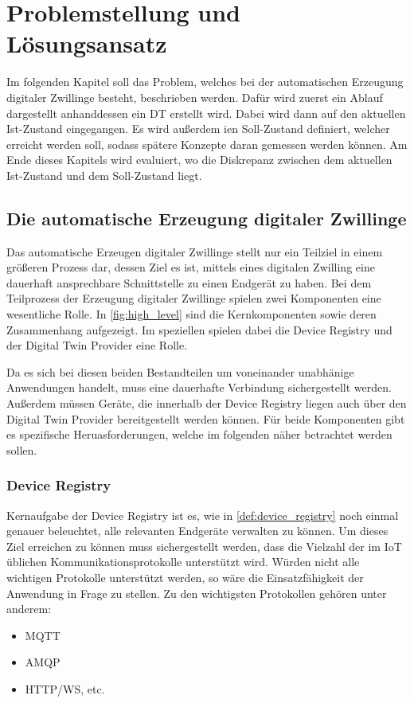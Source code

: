 \chapter{Problemstellung und Lösungsansatz}

Im folgenden Kapitel soll das Problem, welches bei der automatischen Erzeugung digitaler Zwillinge besteht, beschrieben werden. Dafür wird zuerst ein Ablauf dargestellt anhanddessen ein \ac{DT} erstellt wird. Dabei wird dann auf den aktuellen Ist-Zustand eingegangen. Es wird außerdem ien Soll-Zustand definiert, welcher erreicht werden soll, sodass spätere Konzepte daran gemessen werden können. Am Ende dieses Kapitels wird evaluiert, wo die Diskrepanz zwischen dem aktuellen Ist-Zustand und dem Soll-Zustand liegt.

\section{Die automatische Erzeugung digitaler Zwillinge}

Das automatische Erzeugen digitaler Zwillinge stellt nur ein Teilziel in einem größeren Prozess dar, dessen Ziel es ist, mittels eines digitalen Zwilling eine dauerhaft ansprechbare Schnittstelle zu einen Endgerät zu haben. Bei dem Teilprozess der Erzeugung digitaler Zwillinge spielen zwei Komponenten eine wesentliche Rolle. In \vref{fig:high_level} sind die Kernkomponenten sowie deren Zusammenhang aufgezeigt. Im speziellen spielen dabei die Device Registry und der Digital Twin Provider eine Rolle.

Da es sich bei diesen beiden Bestandteilen um voneinander unabhänige Anwendungen handelt, muss eine dauerhafte Verbindung sichergestellt werden. Außerdem müssen Geräte, die innerhalb der Device Registry liegen auch über den Digital Twin Provider bereitgestellt werden können. Für beide Komponenten gibt es spezifische Heruasforderungen, welche im folgenden näher betrachtet werden sollen.

\subsection{Device Registry}

Kernaufgabe der Device Registry ist es, wie in \vref{def:device_registry} noch einmal genauer beleuchtet, alle relevanten Endgeräte verwalten zu können. Um dieses Ziel erreichen zu können muss sichergestellt werden, dass die Vielzahl der im \ac{IoT} üblichen Kommunikationsprotokolle unterstützt wird. Würden nicht alle wichtigen Protokolle unterstützt werden, so wäre die Einsatzfähigkeit der Anwendung in Frage zu stellen. Zu den wichtigsten Protokollen gehören unter anderem:
\begin{itemize}
    \item MQTT
    \item AMQP
    \item HTTP/WS, etc.
\end{itemize}

